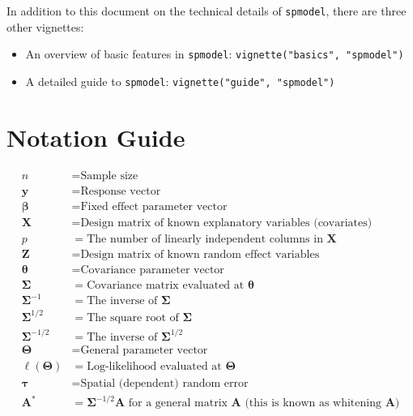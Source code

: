 \documentclass{article}
\providecommand{\tightlist}{%
  \setlength{\itemsep}{0pt}\setlength{\parskip}{0pt}}
\begin{document}
In addition to this document on the technical details of
\texttt{spmodel}, there are three other vignettes:

\begin{itemize}
\tightlist
\item
  An overview of basic features in \texttt{spmodel}:
  \texttt{vignette("basics",\ "spmodel")}
\item
  A detailed guide to \texttt{spmodel}:
  \texttt{vignette("guide",\ "spmodel")}
\end{itemize}

\hypertarget{notation-guide}{%
\section{Notation Guide}\label{notation-guide}}

\begin{equation*}
  \begin{split}
   n & = \text{Sample size} \\
   \mathbf{y} & = \text{Response vector} \\
   \boldsymbol{\beta} & = \text{Fixed effect parameter vector} \\
   \mathbf{X} & = \text{Design matrix of known explanatory variables (covariates)} \\
   p & = \text{The number of linearly independent columns in } \mathbf{X} \\
   \mathbf{Z} & = \text{Design matrix of known random effect variables} \\
   \boldsymbol{\theta} & = \text{Covariance parameter vector} \\   
   \boldsymbol{\Sigma} & = \text{Covariance matrix evaluated at } \boldsymbol{\theta} \\
   \boldsymbol{\Sigma}^{-1} & = \text{The inverse of } \boldsymbol{\Sigma} \\
   \boldsymbol{\Sigma}^{1/2} & = \text{The square root of } \boldsymbol{\Sigma} \\
   \boldsymbol{\Sigma}^{-1/2} & = \text{The inverse of } \boldsymbol{\Sigma}^{1/2} \\
   \boldsymbol{\Theta} & = \text{General parameter vector} \\  
   \ell(\boldsymbol{\Theta}) & = \text{Log-likelihood evaluated at } \boldsymbol{\Theta} \\
   \boldsymbol{\tau} & = \text{Spatial (dependent) random error} \\
   \mathbf{A}^* & = \boldsymbol{\Sigma}^{-1/2}\mathbf{A} \text{ for a general matrix } \mathbf{A} \text{ (this is known as whitening $\mathbf{A}$)} 
  \end{split}
\end{equation*}
\end{document}
